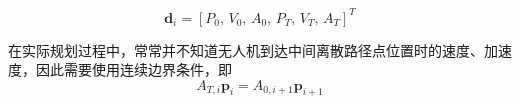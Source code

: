 \begin{equation}
    \bm{d}_i = [P_0, \, V_0, \, A_0, \, P_T, \, V_T, \, A_T]^T
\end{equation}

在实际规划过程中，常常并不知道无人机到达中间离散路径点位置时的速度、加速度，因此需要使用连续边界条件，即
\begin{equation}
    A_{T,i} \bm{p}_i = A_{0,i+1} \bm{p}_{i+1}
\end{equation}




